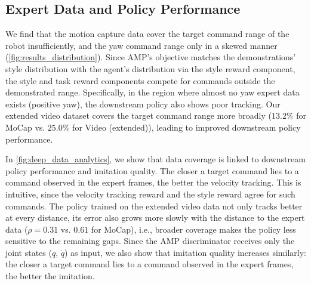 \subsection{Expert Data and Policy Performance}

We find that the motion capture data cover the target command range of the robot insufficiently, and the yaw command range only in a skewed manner (\autoref{fig:results_distribution}). Since AMP's objective matches the demonstrations' style distribution with the agent's distribution via the style reward component, the style and task reward components compete for commands outside the demonstrated range. Specifically, in the region where almost no yaw expert data exists (positive yaw), the downstream policy also shows poor tracking. Our extended video dataset covers the target command range more broadly ($13.2\%$ for MoCap vs. $25.0\%$ for Video (extended)), leading to improved downstream policy performance.

In \autoref{fig:deep_data_analytics}, we show that data coverage is linked to downstream policy performance and imitation quality. The closer a target command lies to a command observed in the expert frames, the better the velocity tracking. This is intuitive, since the velocity tracking reward and the style reward agree for such commands. %
The policy trained on the extended video data not only tracks better at every distance, its error also grows more slowly with the distance to the expert data ($\rho = 0.31$ vs. $0.61$ for MoCap), i.e., broader coverage makes the policy less sensitive to the remaining gaps.
Since the AMP discriminator receives only the joint states ($q$, $\dot{q}$) as input, we also show that imitation quality increases similarly: the closer a target command lies to a command observed in the expert frames, the better the imitation.
